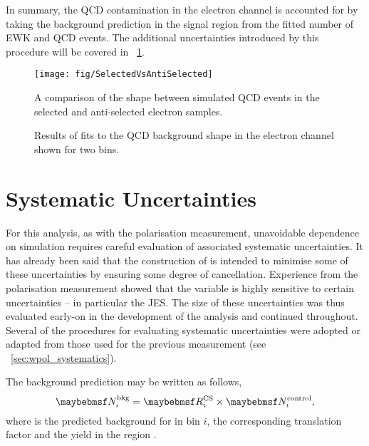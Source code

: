 In summary, the \ac{QCD} contamination in the electron channel is accounted for
by taking the background prediction in the signal region from the fitted number
of \ac{EWK} and \ac{QCD} events. The additional uncertainties introduced by this
procedure will be covered in \sec~\ref{sec:susy_systematics}.

\begin{figure}
\centering
\texttt{[image: fig/SelectedVsAntiSelected]}
\caption[\ac{MC} \LP shape comparison between selected and anti-selected
\ac{QCD} events]{A comparison of the \LP shape between simulated \ac{QCD} events
  in the selected and anti-selected electron samples.}
\label{fig:susy_elqcd_selasel}
\end{figure}


\begin{figure}
\centering
{}\quad
{}
\caption[Results of fits to the \ac{QCD} background shape in the electron
channel]{Results of fits to the \ac{QCD} background shape in the electron
  channel shown for two \STlep bins.}
\label{fig:susy_elqcd}
\end{figure}

\section{Systematic Uncertainties}
\label{sec:susy_systematics}
For this analysis, as with the \PW polarisation measurement, unavoidable
dependence on simulation requires careful evaluation of associated systematic
uncertainties. It has already been said that the construction of \RCS is
intended to minimise some of these uncertainties by ensuring some degree of
cancellation. Experience from the \PW polarisation measurement showed that the
\LP variable is highly sensitive to certain uncertainties -- in particular the
\ac{JES}. The size of these uncertainties was thus evaluated early-on in the
development of the analysis and continued throughout. Several of the procedures
for evaluating systematic uncertainties were adopted or adapted from those used
for the previous measurement (see \sec~\ref{sec:wpol_systematics}).

The background prediction may be written as follows,
\begin{equation*}
\NBkgi = \RCSi \times \NControli,
\end{equation*}
where \NBkgi is the predicted background for \LPsignal in \STlep bin $i$, \RCSi
the corresponding translation factor and \NControli the yield in the region
\LPcontrol.

